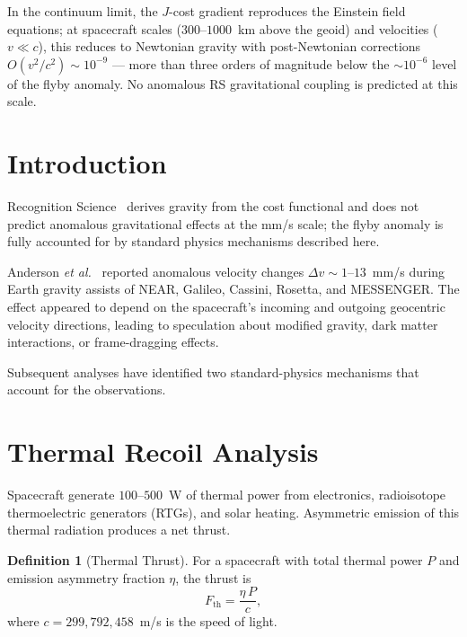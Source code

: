 \documentclass[12pt,a4paper]{article}
\theoremstyle{definition}
\newtheorem{definition}[theorem]{Definition}
\theoremstyle{remark}
\begin{document}
\noindent In the continuum limit, the $J$-cost gradient reproduces the
Einstein field equations; at spacecraft scales ($300$--$1000$~km above the
geoid) and velocities ($v \ll c$), this reduces to Newtonian gravity with
post-Newtonian corrections $O(v^2/c^2) \sim 10^{-9}$ --- more than three
orders of magnitude below the $\sim 10^{-6}$ level of the flyby anomaly.
No anomalous RS gravitational coupling is predicted at this scale.

\section{Introduction}
\label{sec:intro}

Recognition Science~\cite{RS_Axioms} derives gravity from the cost
functional and does not predict anomalous gravitational effects at
the mm/s scale; the flyby anomaly is fully accounted for by
standard physics mechanisms described here.

Anderson \textit{et al.}~\cite{Anderson2008} reported anomalous velocity
changes $\Delta v \sim 1$--$13$~mm/s during Earth gravity assists of
NEAR, Galileo, Cassini, Rosetta, and MESSENGER.  The effect appeared
to depend on the spacecraft's incoming and outgoing geocentric velocity
directions, leading to speculation about modified gravity, dark matter
interactions, or frame-dragging effects.

Subsequent analyses have identified two standard-physics mechanisms that
account for the observations.

\section{Thermal Recoil Analysis}
\label{sec:thermal}

Spacecraft generate $100$--$500$~W of thermal power from electronics,
radioisotope thermoelectric generators (RTGs), and solar heating.
Asymmetric emission of this thermal radiation produces a net thrust.

\begin{definition}[Thermal Thrust]
For a spacecraft with total thermal power $P$ and emission asymmetry
fraction $\eta$, the thrust is
\begin{equation}
  F_{\mathrm{th}} = \frac{\eta \, P}{c},
\end{equation}
where $c = 299{,}792{,}458$~m/s is the speed of light.
\end{definition}
\end{document}
